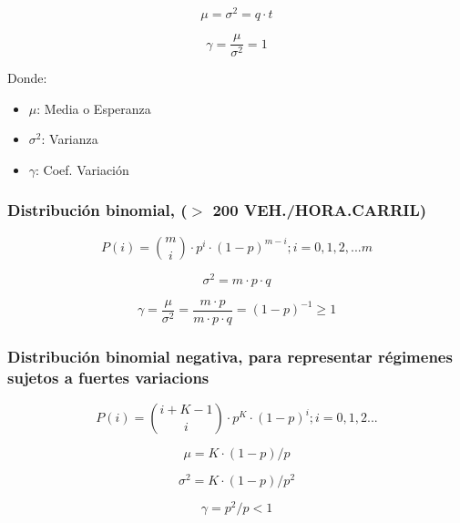 \begin{equation}
    \mu = \sigma^2 = q \cdot t
\end{equation}

\begin{equation}
    \gamma = \frac{\mu}{\sigma^2} = 1
\end{equation}

Donde:
\begin{itemize}
    \item $\mu$: Media o Esperanza
    \item $\sigma^2$: Varianza
    \item $\gamma$: Coef. Variación
\end{itemize}

\subsubsection{Distribución binomial, ($>$ 200 VEH./HORA.CARRIL)}

\begin{equation}
    P(i) = \binom{m}{i} \cdot p^i \cdot (1 - p)^{m-i}; i = 0,1,2,...m
\end{equation}

\begin{equation}
    \sigma^2 = m \cdot p \cdot q
\end{equation}

\begin{equation}
    \gamma = \frac{\mu}{\sigma^2} = \frac{m \cdot p}{m \cdot p \cdot q} = (1 - p)^{-1} \geq 1
\end{equation}

\subsubsection{Distribución binomial negativa, para representar régimenes sujetos a fuertes variacions}

\begin{equation}
    P(i) = \binom{i + K - 1}{i} \cdot p^K \cdot (1 - p)^i; i = 0,1,2... 
\end{equation}

\begin{equation}
    \mu = K \cdot (1 - p)/p
\end{equation}

\begin{equation}
    \sigma^2 = K \cdot (1 - p)/p^2
\end{equation}

\begin{equation}
    \gamma = p^2 / p < 1
\end{equation}


